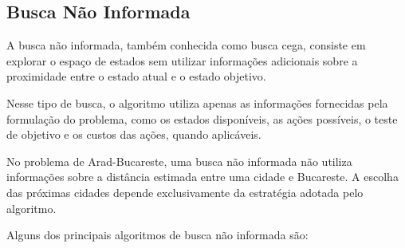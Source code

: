\subsection{Busca Não Informada}

A busca não informada, também conhecida como busca cega, consiste em explorar o espaço de estados sem utilizar informações adicionais sobre a proximidade entre o estado atual e o estado objetivo.

Nesse tipo de busca, o algoritmo utiliza apenas as informações fornecidas pela formulação do problema, como os estados disponíveis, as ações possíveis, o teste de objetivo e os custos das ações, quando aplicáveis.


No problema de Arad-Bucareste, uma busca não informada não utiliza informações sobre a distância estimada entre uma cidade e Bucareste. A escolha das próximas cidades depende exclusivamente da estratégia adotada pelo algoritmo.

Alguns dos principais algoritmos de busca não informada são:

